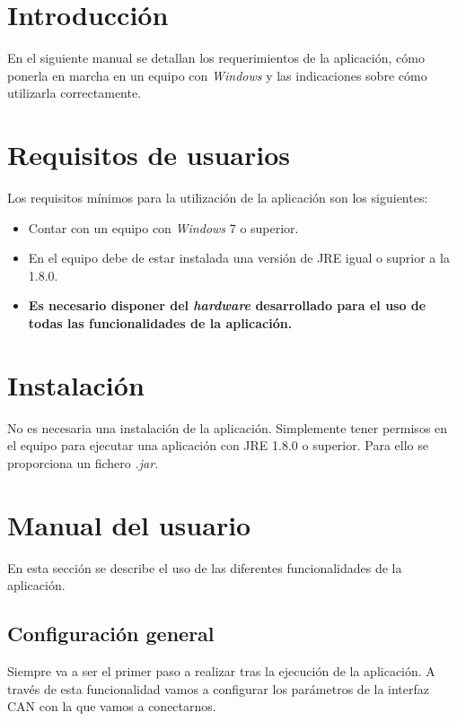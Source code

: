 
\section{Introducción}

En el siguiente manual se detallan los requerimientos de la aplicación, cómo ponerla en marcha en un equipo con \emph{Windows} y las indicaciones sobre cómo utilizarla correctamente.

\section{Requisitos de usuarios}

Los requisitos mínimos para la utilización de la aplicación son los siguientes:

\begin{itemize}
\item
Contar con un equipo con \emph{Windows} 7 o superior.
\item
En el equipo debe de estar instalada una versión de JRE igual o suprior a la 1.8.0.
\item
\textbf{Es necesario disponer del \emph{hardware} desarrollado para el uso de todas las funcionalidades de la aplicación.}
\end{itemize}

\section{Instalación}

No es necesaria una instalación de la aplicación. Simplemente tener permisos en el equipo para ejecutar una aplicación con JRE 1.8.0 o superior. Para ello se proporciona un fichero \emph{.jar}.

\section{Manual del usuario}

En esta sección se describe el uso de las diferentes funcionalidades de la aplicación.

\subsection{Configuración general}

Siempre va a ser el primer paso a realizar tras la ejecución de la aplicación. A través de esta funcionalidad vamos a configurar los parámetros de la interfaz CAN con la que vamos a conectarnos.

